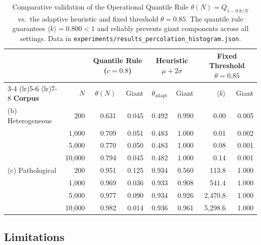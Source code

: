 \documentclass[11pt,a4paper]{article}
\theoremstyle{definition}
\begin{document}
\begin{table}[h]
\centering
\small
\begin{tabular}{lrrrrrrr}
\toprule
& & \multicolumn{2}{c}{\textbf{Quantile Rule ($c=0.8$)}} & \multicolumn{2}{c}{\textbf{Heuristic $\mu + 2\sigma$}} & \multicolumn{2}{c}{\textbf{Fixed Threshold $\theta=0.85$}} \\
\cmidrule(lr){3-4} \cmidrule(lr){5-6} \cmidrule(lr){7-8}
\textbf{Corpus} & $N$ & $\theta(N)$ & Giant & $\theta_{\mathrm{adapt}}$ & Giant & $\langle k \rangle$ & Giant \\
\midrule
(b) Heterogeneous & 200 & 0.631 & 0.045 & 0.492 & 0.990 & 0.00 & 0.005 \\
& 1,000 & 0.709 & 0.051 & 0.483 & 1.000 & 0.01 & 0.002 \\
& 5,000 & 0.770 & 0.050 & 0.483 & 1.000 & 0.08 & 0.001 \\
& 10,000 & 0.794 & 0.045 & 0.482 & 1.000 & 0.14 & 0.001 \\
\midrule
(c) Pathological & 200 & 0.951 & 0.125 & 0.934 & 0.560 & 113.8 & 1.000 \\
& 1,000 & 0.969 & 0.036 & 0.933 & 0.908 & 541.4 & 1.000 \\
& 5,000 & 0.977 & 0.090 & 0.934 & 0.926 & 2,470.8 & 1.000 \\
& 10,000 & 0.982 & 0.014 & 0.936 & 0.961 & 5,298.6 & 1.000 \\
\bottomrule
\end{tabular}
\caption{Comparative validation of the Operational Quantile Rule $\theta(N) = Q_{1 - 0.8/N}$ vs.\ the adaptive heuristic and fixed threshold $\theta = 0.85$. The quantile rule guarantees $\langle k \rangle = 0.800 < 1$ and reliably prevents giant components across all settings. Data in \texttt{experiments/results\_percolation\_histogram.json}.}
\label{tab:quantile_validation}
\end{table}

\subsection{Limitations}
\end{document}
